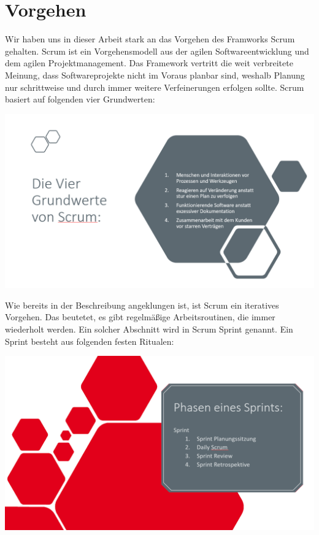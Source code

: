 \section{Vorgehen}
Wir haben uns in dieser Arbeit stark an das Vorgehen des Framworks Scrum gehalten. Scrum ist ein Vorgehensmodell aus der agilen Softwareentwicklung und dem agilen Projektmanagement. Das Framework vertritt die weit verbreitete Meinung, dass Softwareprojekte nicht im Voraus planbar sind, weshalb Planung nur schrittweise und durch immer weitere Verfeinerungen erfolgen sollte. Scrum basiert auf folgenden vier Grundwerten:
\begin{center}
	\includegraphics[width=14cm, keepaspectratio]{img/4Scrum} 
\end{center}

Wie bereits in der Beschreibung angeklungen ist, ist Scrum ein iteratives Vorgehen. Das beutetet, es gibt regelmäßige Arbeitsroutinen, die immer wiederholt werden. Ein solcher Abschnitt wird in Scrum Sprint genannt. Ein Sprint besteht aus folgenden festen Ritualen:
\begin{center}
	\includegraphics[width=14cm, keepaspectratio]{img/5Scrum} 
\end{center}


